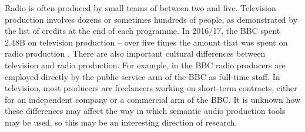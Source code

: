 Radio is often produced by small teams of between two and five. Television production involves dozens or sometimes
hundreds of people, as demonstrated by the list of credits at the end of each programme.  In 2016/17, the BBC spent
\textsterling2.48B on television production -- over five times the amount that was spent on radio production \citep[pp.
39, 111]{Ofcom2017}. There are also important cultural differences between television and radio production. For
example, in the BBC radio producers are employed directly by the public service arm of the BBC as full-time staff. In
television, most producers are freelancers working on short-term contracts, either for an independent company or a
commercial arm of the BBC. It is unknown how these differences may affect the way in which semantic audio production
tools may be used, so this may be an interesting direction of research.




